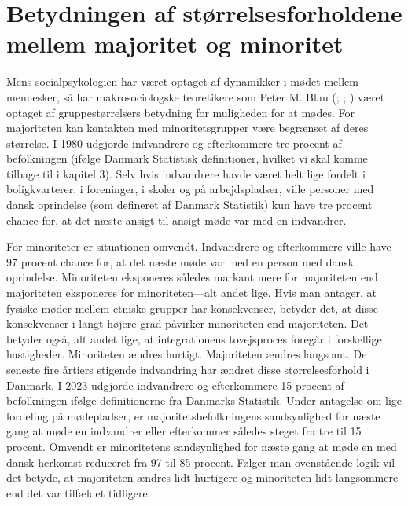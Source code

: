 \documentclass[
]{book}
\begin{document}
\section{Betydningen af størrelsesforholdene mellem majoritet og minoritet}\label{betydningen-af-stuxf8rrelsesforholdene-mellem-majoritet-og-minoritet}

Mens socialpsykologien har været optaget af dynamikker i mødet mellem mennesker, så har makrosociologske teoretikere som Peter M. Blau (; ; ) været optaget af gruppestørrelsers betydning for muligheden for at mødes. For majoriteten kan kontakten med minoritetsgrupper være begrænset af deres størrelse. I 1980 udgjorde indvandrere og efterkommere tre procent af befolkningen (ifølge Danmark Statistisk definitioner, hvilket vi skal komme tilbage til i kapitel 3). Selv hvis indvandrere havde været helt lige fordelt i boligkvarterer, i foreninger, i skoler og på arbejdspladser, ville personer med dansk oprindelse (som defineret af Danmark Statistik) kun have tre procent chance for, at det næste ansigt-til-ansigt møde var med en indvandrer.

For minoriteter er situationen omvendt. Indvandrere og efterkommere ville have 97 procent chance for, at det næste møde var med en person med dansk oprindelse. Minoriteten eksponeres således markant mere for majoriteten end majoriteten eksponeres for minoriteten---alt andet lige. Hvis man antager, at fysiske møder mellem etniske grupper har konsekvenser, betyder det, at disse konsekvenser i langt højere grad påvirker minoriteten end majoriteten. Det betyder også, alt andet lige, at integrationens tovejsproces foregår i forskellige hastigheder. Minoriteten ændres hurtigt. Majoriteten ændres langsomt.
De seneste fire årtiers stigende indvandring har ændret disse størrelsesforhold i Danmark. I 2023 udgjorde indvandrere og efterkommere 15 procent af befolkningen ifølge definitionerne fra Danmarks Statistik. Under antagelse om lige fordeling på mødepladser, er majoritetsbefolkningens sandsynlighed for næste gang at møde en indvandrer eller efterkommer således steget fra tre til 15 procent. Omvendt er minoritetens sandsynlighed for næste gang at møde en med dansk herkomst reduceret fra 97 til 85 procent. Følger man ovenstående logik vil det betyde, at majoriteten ændres lidt hurtigere og minoriteten lidt langsommere end det var tilfældet tidligere.
\end{document}
